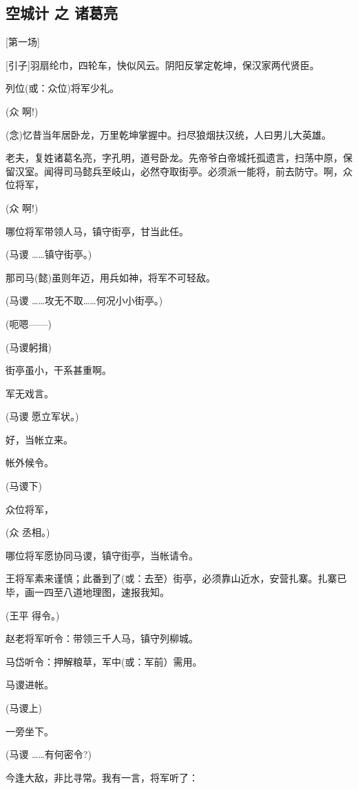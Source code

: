 \hypertarget{ux7a7aux57ceux8ba1-ux4e4b-ux8bf8ux845bux4eae}{%
\subsection{空城计 之
诸葛亮}\label{ux7a7aux57ceux8ba1-ux4e4b-ux8bf8ux845bux4eae}}

{[}第一场{]}

{[}引子{]}羽扇纶巾，四轮车，快似风云。阴阳反掌定乾坤，保汉家两代贤臣。

列位(或：众位)将军少礼。

(众 啊!)

(念)忆昔当年居卧龙，万里乾坤掌握中。扫尽狼烟扶汉统，人曰男儿大英雄。

老夫，复姓诸葛名亮，字孔明，道号卧龙。先帝爷白帝城托孤遗言，扫荡中原，保留汉室。闻得司马懿兵至岐山，必然夺取街亭。必须派一能将，前去防守。啊，众位将军，

(众 啊!)

哪位将军带领人马，镇守街亭，甘当此任。

(马谡 \ldots{}\ldots{}镇守街亭。)

那司马(懿)虽则年迈，用兵如神，将军不可轻敌。

(马谡 \ldots{}\ldots{}攻无不取\ldots{}\ldots{}何况小小街亭。)

(呃嗯------)

(马谡躬揖)

街亭虽小，干系甚重啊。

军无戏言。

(马谡 愿立军状。)

好，当帐立来。

帐外候令。

(马谡下)

众位将军，

(众 丞相。)

哪位将军愿协同马谡，镇守街亭，当帐请令。

王将军素来谨慎；此番到了(或：去至）街亭，必须靠山近水，安营扎寨。扎寨已毕，画一四至八道地理图，速报我知。

(王平 得令。)

赵老将军听令：带领三千人马，镇守列柳城。

马岱听令：押解粮草，军中(或：军前）需用。

马谡进帐。

(马谡上)

一旁坐下。

(马谡 \ldots{}\ldots{}有何密令?)

今逢大敌，非比寻常。我有一言，将军听了：

